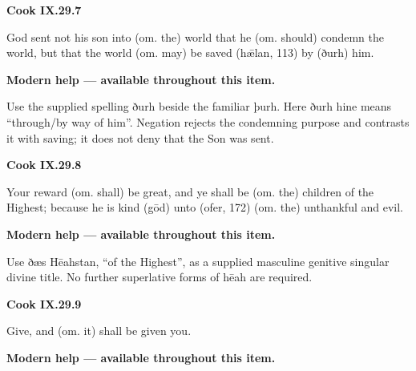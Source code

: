 \par\begin{minipage}{\linewidth}\raggedright
\textbf{Cook IX.29.7}

God sent not his son into (om. the) world that he (om. should) condemn the world, but that the world (om. may) be saved (hǣlan, 113) by (ðurh) him.

\textbf{Modern help — available throughout this item.}

\end{minipage}\par\addvspace{4pt}

Use the supplied spelling ðurh beside the familiar þurh. Here ðurh hine means “through/\allowbreak{}by way of him”. Negation rejects the condemning purpose and contrasts it with saving; it does not deny that the Son was sent.

\par\begin{minipage}{\linewidth}\raggedright
\textbf{Cook IX.29.8}

Your reward (om. shall) be great, and ye shall be (om. the) children of the Highest; because he is kind (gōd) unto (ofer, 172) (om. the) unthankful and evil.

\textbf{Modern help — available throughout this item.}

\end{minipage}\par\addvspace{4pt}

Use ðæs Hēahstan, “of the Highest”, as a supplied masculine genitive singular divine title. No further superlative forms of hēah are required.

\par\begin{minipage}{\linewidth}\raggedright
\textbf{Cook IX.29.9}

Give, and (om. it) shall be given you.

\textbf{Modern help — available throughout this item.}

\end{minipage}\par\addvspace{4pt}

